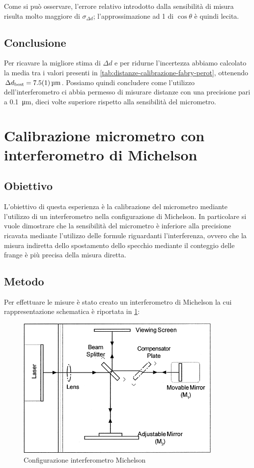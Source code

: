 \documentclass[a4paper]{article}
\begin{document}
Come si può osservare, l'errore relativo introdotto dalla sensibilità di misura risulta molto maggiore di $\sigma_{\Delta d}$; l'approssimazione ad 1 di $\cos{\theta}$ è quindi lecita.

\subsection{Conclusione}
Per ricavare la migliore stima di $\Delta d$ e per ridurne l'incertezza abbiamo calcolato la media tra i valori presenti in \cref{tab:distanze-calibrazione-fabry-perot}, ottenendo $\Delta d_{\text{best}} = \SI{7.5 \pm 0.1}{\micro\meter}$. Possiamo quindi concludere come l'utilizzo dell'interferometro ci abbia permesso di misurare distanze con una precisione pari a \SI{0.1}{\micro\meter}, dieci volte superiore rispetto alla sensibilità del micrometro.

\section{Calibrazione micrometro con interferometro di Michelson}
\subsection{Obiettivo}
L'obiettivo di questa esperienza è la calibrazione del micrometro mediante l'utilizzo di un interferometro nella configurazione di Michelson. In particolare si vuole dimostrare che la sensibilità del micrometro è inferiore alla precisione ricavata mediante l'utilizzo delle formule riguardanti l'interferenza, ovvero che la misura indiretta dello spostamento dello specchio mediante il conteggio delle frange è più precisa della misura diretta.

\subsection{Metodo}
Per effettuare le misure è stato creato un interferometro di Michelson la cui rappresentazione schematica è riportata in \cref{fig:configurazione-michelson}:

\begin{figure}[htbp]
\centering
\includegraphics[width=0.9\textwidth]{grafici/configurazione michaelson.png}
\caption{Configurazione interferometro Michelson}
\label{fig:configurazione-michelson}
\end{figure}
\end{document}
